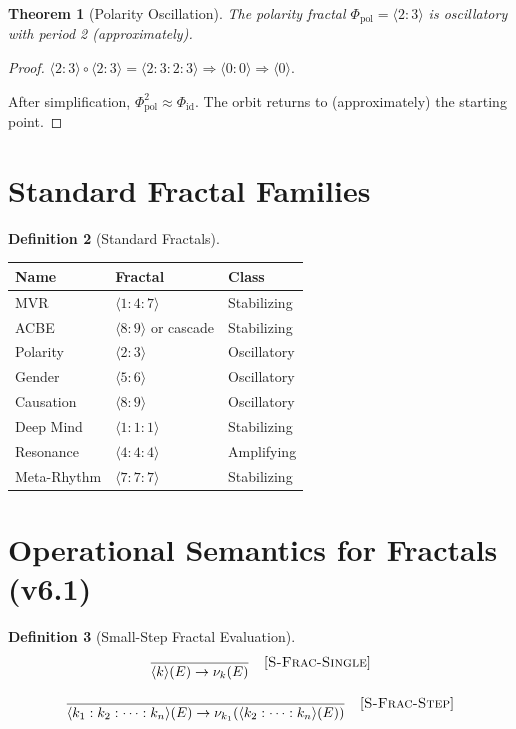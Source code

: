 \documentclass[11pt,twoside,openright]{book}
\theoremstyle{definition}
\newtheorem{definition}{Definition}[chapter]
\theoremstyle{plain}
\newtheorem{theorem}[definition]{Theorem}
\theoremstyle{remark}
\newcommand{\noe}[1]{\nu_{#1}}
\newcommand{\Frac}{\Phi}
\newcommand{\id}{\mathrm{id}}
\newcommand{\smallstep}{\to}
\begin{document}
\begin{theorem}[Polarity Oscillation]
\label{thm:polarity-oscillation}
The polarity fractal $\Frac_{\text{pol}} = \langle 2 : 3 \rangle$ is oscillatory with period 2 (approximately).
\end{theorem}

\begin{proof}
$\langle 2 : 3 \rangle \circ \langle 2 : 3 \rangle = \langle 2 : 3 : 2 : 3 \rangle \Rightarrow \langle 0 : 0 \rangle \Rightarrow \langle 0 \rangle$.

After simplification, $\Frac_{\text{pol}}^2 \approx \Frac_{\id}$. The orbit returns to (approximately) the starting point.
\end{proof}

\section{Standard Fractal Families}

\begin{definition}[Standard Fractals]
\label{def:standard-fractals}
\begin{center}
\begin{tabular}{lll}
\toprule
\textbf{Name} & \textbf{Fractal} & \textbf{Class} \\
\midrule
MVR & $\langle 1 : 4 : 7 \rangle$ & Stabilizing \\
ACBE & $\langle 8 : 9 \rangle$ or cascade & Stabilizing \\
Polarity & $\langle 2 : 3 \rangle$ & Oscillatory \\
Gender & $\langle 5 : 6 \rangle$ & Oscillatory \\
Causation & $\langle 8 : 9 \rangle$ & Oscillatory \\
Deep Mind & $\langle 1 : 1 : 1 \rangle$ & Stabilizing \\
Resonance & $\langle 4 : 4 : 4 \rangle$ & Amplifying \\
Meta-Rhythm & $\langle 7 : 7 : 7 \rangle$ & Stabilizing \\
\bottomrule
\end{tabular}
\end{center}
\end{definition}

\section{Operational Semantics for Fractals (v6.1)}

\begin{definition}[Small-Step Fractal Evaluation]
\label{def:fractal-smallstep}
\[
\frac{}{\langle k \rangle(E) \smallstep \noe{k}(E)} \quad [\textsc{S-Frac-Single}]
\]

\[
\frac{}{\langle k_1 : k_2 : \cdots : k_n \rangle(E) \smallstep \noe{k_1}(\langle k_2 : \cdots : k_n \rangle(E))} \quad [\textsc{S-Frac-Step}]
\]
\end{definition}
\end{document}
